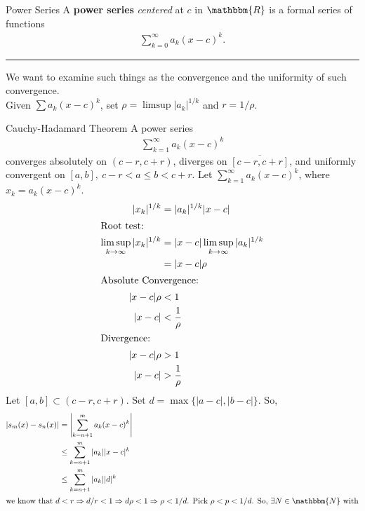 \documentclass[10pt]{extarticle}
\newcommand{\N}{\mathbbm{N}}
\newcommand{\R}{\mathbbm{R}}
\begin{document}
  \begin{problem}{Power Series}
    A \textbf{power series} \textit{centered} at $c$ in $\R$ is a formal series of functions
    \begin{align*}
      \sum_{k=0}^{\infty} a_k(x-c)^k.
    \end{align*}
    \vspace{4pt}
    \rule{\textwidth}{0.4pt}
    \vspace{4pt}
    We want to examine such things as the convergence and the uniformity of such convergence.\\

    Given $\sum a_k(x-c)^k$, set $\rho = \limsup|a_k|^{1/k}$ and $r = 1/\rho$.
  \end{problem}
  \begin{problem}{Cauchy-Hadamard Theorem}
    A power series
    \begin{align*}
      \sum_{k=1}^{\infty} a_k(x-c)^k
    \end{align*}
    converges absolutely on $(c-r,c+r)$, diverges on $\overline{[c-r,c+r]}$, and uniformly convergent on $[a,b],~c-r < a \leq b < c + r$.
    \tcblower
    Let $\sum_{k=1}^{\infty} a_k(x-c)^k$, where $x_k = a_k(x-c)^k$.
    \begin{align*}
      |x_k|^{1/k} &= |a_k|^{1/k}|x-c|\\
      \shortintertext{Root test:}
      \limsup_{k\rightarrow\infty}|x_k|^{1/k} &= |x-c|\limsup_{k\rightarrow\infty}|a_k|^{1/k}\\
                                              &= |x-c|\rho\\
                                              \shortintertext{Absolute Convergence:}
      |x-c|\rho &< 1\\
      |x-c| &< \frac{1}{\rho}\\
      \shortintertext{Divergence:}
      |x-c| \rho &> 1\\
      |x-c| &> \frac{1}{\rho}
    \end{align*}
    Let $[a,b] \subset (c-r,c+r)$. Set $d = \max\{|a-c|,|b-c|\}$. So, 
    \begin{align*}
      |s_m(x) - s_n(x)| &= \left|\sum_{k=n+1}^{m}a_k(x-c)^k\right|\\
                        &\leq \sum_{k=n+1}^{m}|a_k||x-c|^k\\
                        &\leq \sum_{k=n+1}^{m}|a_k||d|^k\\
    \intertext{we know that $d < r \Rightarrow d/r < 1 \Rightarrow d\rho < 1 \Rightarrow \rho < 1/d$. Pick $\rho < p < 1/d$. So, $\exists N\in\N$ with}

\end{align*}
\end{problem}
\end{document}
